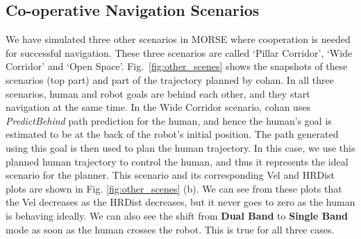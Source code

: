 \subsection{Co-operative Navigation Scenarios}
We have simulated three other scenarios in MORSE where cooperation is needed for successful navigation. These three scenarios are called `Pillar Corridor', `Wide Corridor' and `Open Space'. Fig.~\ref{fig:other_scenes} shows the snapshots of these scenarios (top part) and part of the trajectory planned by \acrshort{cohan}. In all three scenarios, human and robot goals are behind each other, and they start navigation at the same time. In the Wide Corridor scenario, 
\acrshort{cohan} uses \textit{PredictBehind} path prediction for the human, and hence the human's goal is estimated to be at the back of the robot's initial position. The path generated using this goal is then used to plan the human trajectory. In this case, we use this planned human trajectory to control the human, and thus it represents the ideal scenario for the planner. This scenario and its corresponding Vel and HRDist plots are shown in Fig. \ref{fig:other_scenes} (b). We can see from these plots that the Vel decreases as the HRDist decreases, but it never goes to zero as the human is behaving ideally. We can also see the shift from \textbf{Dual Band} to \textbf{Single Band} mode as soon as the human crosses the robot. This is true for all three cases. 
